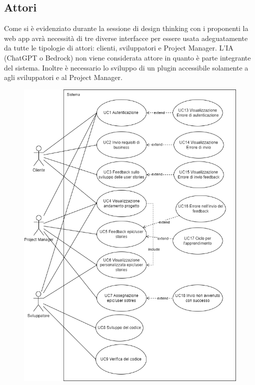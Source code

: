 \documentclass{article}
\begin{document}
\subsection*{Attori}
Come si è evidenziato durante la sessione di design thinking con i proponenti la web app avrà necessità di tre diverse interfacce per essere usata adeguatamente da tutte le tipologie di attori: clienti, sviluppatori e Project Manager. L'IA (ChatGPT o Bedrock) non viene considerata attore in quanto è parte integrante del sistema. Inoltre è necessario lo sviluppo di un plugin accessibile solamente a agli sviluppatori e al Project Manager.

\newpage
\begin{figure}[h]
    \centering
    \includegraphics[height = 0.75\textheight]{./imgUML/UML.png}
    \label{fig:immagine}
\end{figure}
\newpage
\end{document}
